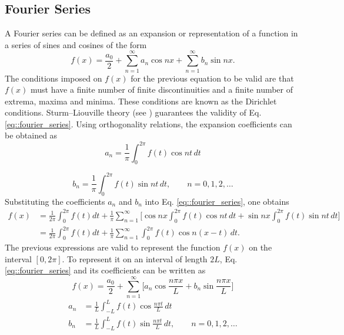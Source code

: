 \documentclass[a4paper]{article}
\begin{document}
\subsection{Fourier Series}
A Fourier series can be defined as an expansion or representation of a function in a series of sines and cosines of the form
\begin{equation}\label{eq::fourier_series}
f(x)=\frac{a_0}{2}+\sum_{n=1}^\infty a_n \cos nx + \sum_{n=1}^\infty b_n \sin nx.
\end{equation}
The conditions imposed on $f(x)$ for the previous equation to be valid are that $f(x)$ must have a finite number of finite discontinuities and a finite number of extrema, maxima and minima. These conditions are known as the Dirichlet conditions. Sturm--Liouville theory (see \cite{Arfken}) guarantees the validity of Eq. \ref{eq::fourier_series}. Using orthogonality relations, the expansion coefficients can be obtained as
\begin{equation*}
a_n=\frac{1}{\pi} \int^{2\pi}_0 f(t) \cos{nt}\, dt
\end{equation*}

\begin{equation*}
b_n=\frac{1}{\pi} \int^{2\pi}_0 f(t) \sin{nt}\, dt, \qquad n=0,1,2,\ldots
\end{equation*}
Substituting the coefficients $a_n$ and $b_n$ into Eq. \ref{eq::fourier_series}, one obtains
\begin{equation}
\begin{aligned}
f(x)&=\frac{1}{2\pi}\int_0^{2\pi} f(t)dt+\frac{1}{\pi}\sum_{n=1}^\infty\Big[ \cos{nx}\int_0^{2\pi} f(t) \cos{nt}\,dt + \sin{nx}\int_0^{2\pi} f(t) \sin{nt}\,dt \Big]\\
&=\frac{1}{2\pi}\int_0^{2\pi} f(t)dt+\frac{1}{\pi}\sum^\infty_{n=1} \int^{2\pi}_0 f(t)\cos{n(x-t)}\,dt.
\end{aligned}
\end{equation}
The previous expressions are valid to represent the function $f(x)$ on the interval $[0,2\pi]$. To represent it on an interval of length $2L$, Eq. \ref{eq::fourier_series} and its coefficients can be written as
\begin{equation}
f(x)=\frac{a_0}{2}+\sum_{n=1}^\infty \Big[ a_n \cos{\frac{n\pi x}{L}} + b_n \sin{\frac{n\pi x}{L}} \Big]
\end{equation}
\begin{equation}\label{eq::Fourier_coeff}
\begin{aligned}
a_n&=\frac{1}{L} \int^{L}_{-L} f(t) \cos{\frac{n\pi t}{L}}\, dt \\
b_n&=\frac{1}{L} \int^{L}_{-L} f(t) \sin{\frac{n\pi t}{L}}\, dt, \qquad n=0,1,2,\ldots
\end{aligned}
\end{equation}
\end{document}
